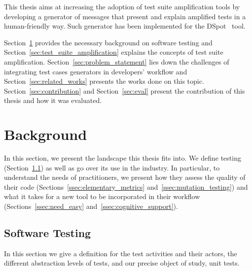 \documentclass[a4paper,11pt]{sdm_internship}
\newcommand{\todo}[1]{\colorbox{Red!75}{\textcolor{white}{\textbf{TODO\ifx&#1&\else: #1\fi}}}}
\newcommand{\dspot}{DSpot\xspace}
\theoremstyle{definition}
\begin{document}
This thesis aims at increasing the adoption of test suite amplification tools by developing a generator of messages that present and explain amplified tests in a human-friendly way.
Such generator has been implemented for the \dspot{}~\cite{baudry2015dspot} tool.

Section~\ref{sec:background} provides the necessary background on software testing and Section~\ref{sec:test_suite_amplification} explains the concepts of test suite amplification.
Section~\ref{sec:problem_statement} lies down the challenges of integrating test cases generators in developers' workflow and Section~\ref{sec:related_works} presents the works done on this topic.
Section~\ref{sec:contribution} and Section~\ref{sec:eval} present the contribution of this thesis and how it was evaluated.



\section{Background}%
\label{sec:background}
In this section, we present the landscape this thesis fits into.
We define testing (Section~\ref{ssec:software_testing}) as well as go over its use in the industry.
In particular, to understand the needs of practitioners, we present how they assess the quality of their code (Sections~\ref{ssec:elementary_metrics} and~\ref{ssec:mutation_testing}) and what it takes for a new tool to be incorporated in their workflow (Sections~\ref{ssec:need_easy} and~\ref{ssec:cognitive_support}).

\subsection{Software Testing}%
\label{ssec:software_testing}
In this section we give a definition for the test activities and their actors, the different abstraction levels of tests, and our precise object of study, unit tests.



\end{document}
